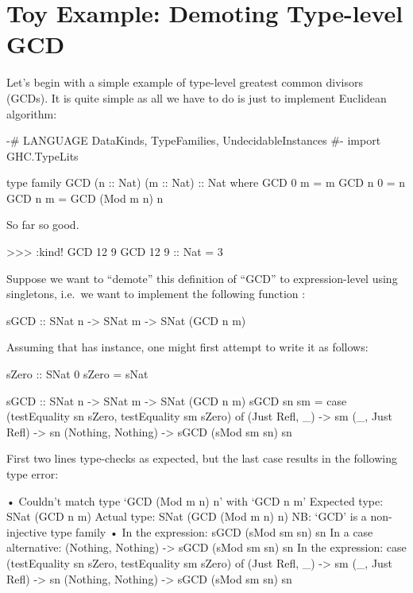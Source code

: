 \documentclass[demotion-paper.tex]{subfiles}
\begin{document}
\section{Toy Example: Demoting Type-level GCD}
Let's begin with a simple example of type-level greatest common divisors (GCDs).
It is quite simple as all we have to do is just to implement Euclidean algorithm:


\begin{code}
{-# LANGUAGE DataKinds, TypeFamilies, UndecidableInstances #-}
import GHC.TypeLits

type family GCD (n :: Nat) (m :: Nat) :: Nat where
  GCD 0 m = m
  GCD n 0 = n
  GCD n m = GCD (Mod m n) n
\end{code}

So far so good.

\begin{repl}
>>> :kind! GCD 12 9
GCD 12 9 :: Nat
= 3
\end{repl}

Suppose we want to ``demote'' this definition of ``GCD'' to expression-level using singletons, i.e.\ we want to implement the following function :

\begin{code}
sGCD :: SNat n -> SNat m -> SNat (GCD n m)
\end{code}

Assuming that  has  instance, one might first attempt to write it as follows:

\begin{code}
sZero :: SNat 0
sZero = sNat

sGCD :: SNat n -> SNat m -> SNat (GCD n m)
sGCD sn sm = case (testEquality sn sZero, testEquality sm sZero) of
  (Just Refl, _) -> sm
  (_, Just Refl) -> sn
  (Nothing, Nothing) -> sGCD (sMod sm sn) sn
\end{code}

First two lines type-checks as expected, but the last case results in the following type error:

\begin{repl}
• Couldn't match type ‘GCD (Mod m n) n’ with ‘GCD n m’
  Expected type: SNat (GCD n m)
    Actual type: SNat (GCD (Mod m n) n)
  NB: ‘GCD’ is a non-injective type family
• In the expression: sGCD (sMod sm sn) sn
  In a case alternative: (Nothing, Nothing) -> sGCD (sMod sm sn) sn
  In the expression:
    case (testEquality sn sZero, testEquality sm sZero) of
      (Just Refl, _) -> sm
      (_, Just Refl) -> sn
      (Nothing, Nothing) -> sGCD (sMod sm sn) sn
\end{repl}
\end{document}
